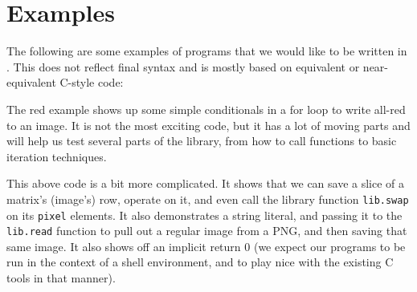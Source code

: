 \chapter{Examples}
\label{sec:examples}

The following are some examples of programs that we would like to be written in \lepix{}. This does not reflect final syntax and is mostly based on equivalent or near-equivalent C-style code:



The red example shows up some simple conditionals in a for loop to write all-red to an image. It is not the most exciting code, but it has a lot of moving parts and will help us test several parts of the library, from how to call functions to basic iteration techniques.



This above code is a bit more complicated. It shows that we can save a slice of a matrix's (image's) row, operate on it, and even call the library function \lstinline|lib.swap| on its \lstinline|pixel| elements. It also demonstrates a string literal, and passing it to the \lstinline|lib.read| function to pull out a regular image from a PNG, and then saving that same image. It also shows off an implicit return 0 (we expect our programs to be run in the context of a shell environment, and to play nice with the existing C tools in that manner).
